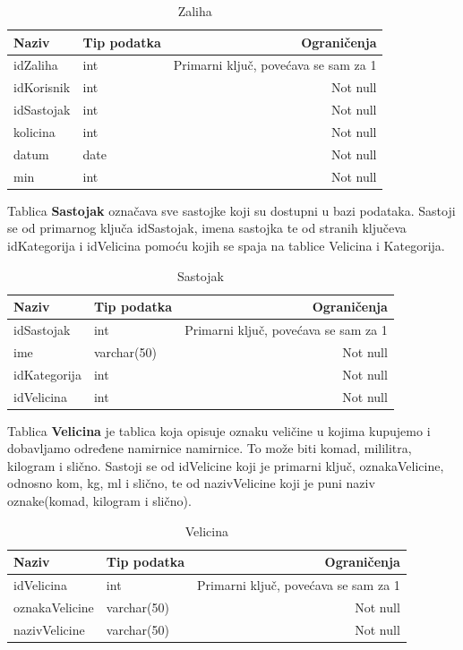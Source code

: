 \documentclass[diplomskirad]{fer}
\begin{document}
\begin{table}[htb]
\label{tbl:Zaliha}
\centering
\renewcommand{\arraystretch}{1.3}
\begin{tabular}{llr} \hline
Naziv & Tip podatka & Ograničenja\\ \hline
idZaliha & int & Primarni ključ, povećava se sam za 1 \\
idKorisnik & int & Not null\\
idSastojak & int & Not null\\
kolicina & int & Not null\\
datum & date & Not null\\
min & int & Not null\\
\end{tabular}
\caption{Zaliha}
\end{table}

Tablica \textbf{Sastojak} označava sve sastojke koji su dostupni u bazi podataka. Sastoji se od primarnog ključa idSastojak, imena sastojka te od stranih ključeva idKategorija i idVelicina pomoću kojih se spaja na tablice Velicina i Kategorija. 


\begin{table}[H]
\label{tbl:Sastojak}
\centering

\begin{tabular}{llr} \hline
Naziv & Tip podatka & Ograničenja\\ \hline
idSastojak & int & Primarni ključ, povećava se sam za 1 \\
ime & varchar(50) & Not null\\
idKategorija & int & Not null\\
idVelicina & int & Not null\\
\end{tabular}
\caption{Sastojak}
\end{table}


Tablica \textbf{Velicina} je tablica koja opisuje oznaku veličine u kojima kupujemo i dobavljamo određene namirnice namirnice. To može biti komad, mililitra, kilogram i slično. Sastoji se od idVelicine koji je primarni ključ, oznakaVelicine, odnosno kom, kg, ml i slično, te od nazivVelicine koji je puni naziv oznake(komad, kilogram i slično).


\begin{table}[H]
\label{tbl:Velicina}
\centering
\renewcommand{\arraystretch}{1.3}
\begin{tabular}{llr} \hline
Naziv & Tip podatka & Ograničenja\\ \hline
idVelicina & int & Primarni ključ, povećava se sam za 1 \\
oznakaVelicine & varchar(50) & Not null\\
nazivVelicine & varchar(50) & Not null\\
\end{tabular}
\caption{Velicina}
\end{table}
\end{document}
